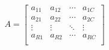 \[
A =
\left[ {\begin{array}{cccc}
 a_{11} & a_{12} & \cdots & a_{1C}  \\
 a_{21} & a_{22} & \cdots & a_{2C}  \\
 \vdots & \vdots & \ddots & \vdots  \\
 a_{R1} & a_{R2} & \cdots & a_{RC}  \\
 \end{array} } \right]
\]